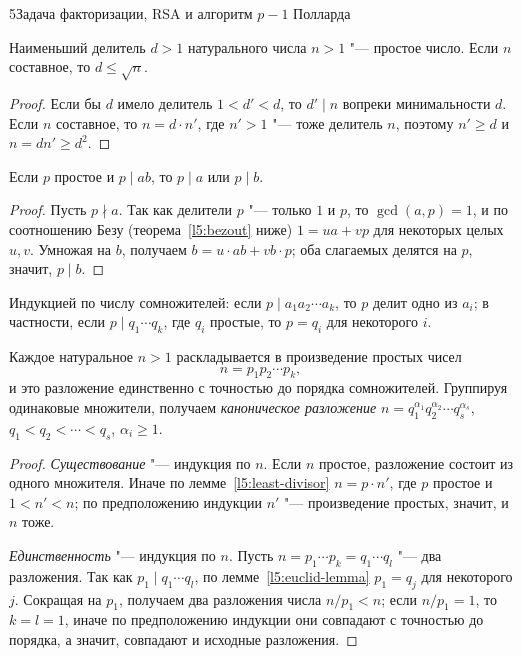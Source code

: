 \begin{lecture}{5}{Задача факторизации, RSA и алгоритм \texorpdfstring{$p - 1$}{p - 1} Полларда}
\begin{lemma}\label{l5:least-divisor}
Наименьший делитель $d > 1$ натурального числа $n > 1$ "--- простое число. Если $n$ составное,
то $d \le \sqrt n$.
\end{lemma}

\begin{proof}
Если бы $d$ имело делитель $1 < d' < d$, то $d' \mid n$ вопреки минимальности $d$. Если $n$
составное, то $n = d \cdot n'$, где $n' > 1$ "--- тоже делитель $n$, поэтому $n' \ge d$ и
$n = d n' \ge d^2$.
\end{proof}

\begin{lemma}[Евклид]\label{l5:euclid-lemma}
Если $p$ простое и $p \mid ab$, то $p \mid a$ или $p \mid b$.
\end{lemma}

\begin{proof}
Пусть $p \nmid a$. Так как делители $p$ "--- только $1$ и $p$, то $\gcd(a, p) = 1$, и по
соотношению Безу (теорема~\ref{l5:bezout} ниже) $1 = ua + vp$ для некоторых целых $u, v$.
Умножая на $b$, получаем $b = u \cdot ab + vb \cdot p$; оба слагаемых делятся на $p$,
значит, $p \mid b$.
\end{proof}

Индукцией по числу сомножителей: если $p \mid a_1 a_2 \cdots a_k$, то $p$ делит одно из
$a_i$; в частности, если $p \mid q_1 \cdots q_k$, где $q_i$ простые, то $p = q_i$ для
некоторого $i$.

\begin{theorem}\label{l5:fta}
Каждое натуральное $n > 1$ раскладывается в произведение простых чисел
\[
  n = p_1 p_2 \cdots p_k,
\]
и это разложение единственно с точностью до порядка сомножителей. Группируя одинаковые
множители, получаем \emph{каноническое разложение}
$n = q_1^{\alpha_1} q_2^{\alpha_2} \cdots q_s^{\alpha_s}$, $q_1 < q_2 < \cdots < q_s$,
$\alpha_i \ge 1$.
\end{theorem}

\begin{proof}
\emph{Существование} "--- индукция по $n$. Если $n$ простое, разложение состоит из одного
множителя. Иначе по лемме~\ref{l5:least-divisor} $n = p \cdot n'$, где $p$ простое и
$1 < n' < n$; по предположению индукции $n'$ "--- произведение простых, значит, и $n$ тоже.

\emph{Единственность} "--- индукция по $n$. Пусть $n = p_1 \cdots p_k = q_1 \cdots q_l$ "---
два разложения. Так как $p_1 \mid q_1 \cdots q_l$, по лемме~\ref{l5:euclid-lemma}
$p_1 = q_j$ для некоторого $j$. Сокращая на $p_1$, получаем два разложения числа
$n / p_1 < n$; если $n/p_1 = 1$, то $k = l = 1$, иначе по предположению индукции они
совпадают с точностью до порядка, а значит, совпадают и исходные разложения.
\end{proof}


\end{lecture}
